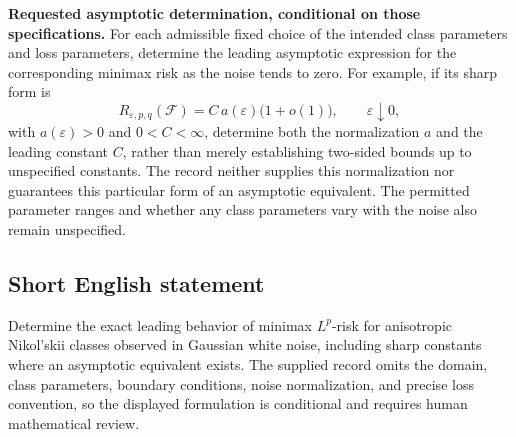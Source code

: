 \documentclass[11pt]{article}
\begin{document}
\textbf{Requested asymptotic determination, conditional on those specifications.} For each admissible fixed choice of the intended class parameters and loss parameters, determine the leading asymptotic expression for the corresponding minimax risk as the noise tends to zero. For example, if its sharp form is
\[
R_{\varepsilon,p,q}(\mathcal F)
=C\,a(\varepsilon)\bigl(1+o(1)\bigr),\qquad \varepsilon\downarrow0,
\]
with \(a(\varepsilon)>0\) and \(0<C<\infty\), determine both the normalization \(a\) and the leading constant \(C\), rather than merely establishing two-sided bounds up to unspecified constants. The record neither supplies this normalization nor guarantees this particular form of an asymptotic equivalent. The permitted parameter ranges and whether any class parameters vary with the noise also remain unspecified.
\subsection{Short English statement}
Determine the exact leading behavior of minimax \(L^p\)-risk for anisotropic Nikol'skii classes observed in Gaussian white noise, including sharp constants where an asymptotic equivalent exists. The supplied record omits the domain, class parameters, boundary conditions, noise normalization, and precise loss convention, so the displayed formulation is conditional and requires human mathematical review.
\end{document}
